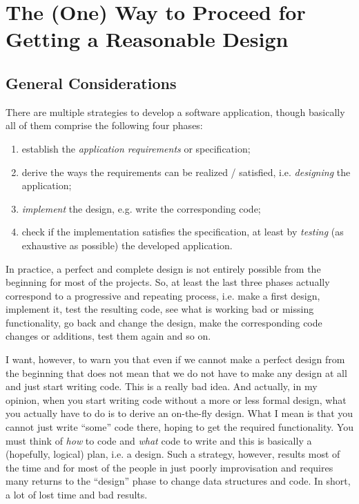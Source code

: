 
\chapter{The (One) Way to Proceed for Getting a Reasonable Design}

\section{General Considerations}

There are multiple strategies to develop a software application, though basically all of them comprise the following four phases:
\begin{enumerate}
    \item establish the \textit{application requirements} or specification;
    \item derive the ways the requirements can be realized / satisfied, i.e. \textit{designing} the application;
    \item \textit{implement} the design, e.g. write the corresponding code;
    \item check if the implementation satisfies the specification, at least by \textit{testing} (as exhaustive as possible) the developed application.
\end{enumerate}

In practice, a perfect and complete design is not entirely possible from the beginning for most of the projects. So, at least the last three phases actually correspond to a progressive and repeating process, i.e. make a first design, implement it, test the resulting code, see what is working bad or missing functionality, go back and change the design, make the corresponding code changes or additions, test them again and so on. 

I want, however, to warn you that even if we cannot make a perfect design from the beginning that does not mean that we do not have to make any design at all and just start writing code. This is a really bad idea. And actually, in my opinion, when you start writing code without a more or less formal design, what you actually have to do is to derive an on-the-fly design. What I mean is that you cannot just write ``some'' code there, hoping to get the required functionality. You must think of \textit{how} to code and \textit{what} code to write and this is basically a (hopefully, logical) plan, i.e. a design. Such a strategy, however, results most of the time and for most of the people in just poorly improvisation and requires many returns to the ``design'' phase to change data structures and code. In short, a lot of lost time and bad results. 

